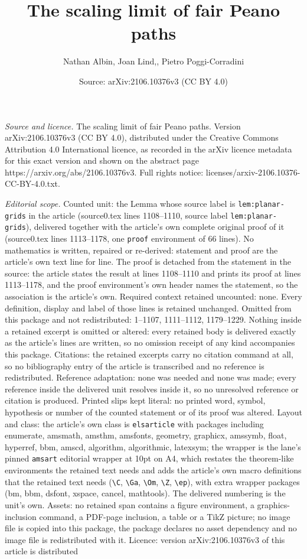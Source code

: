 \documentclass[10pt,a4paper]{amsart}
\title[The scaling limit of fair Peano paths]{The scaling limit of fair Peano paths}
\author{Nathan Albin, Joan Lind,, Pietro Poggi-Corradini}
\date{Source: arXiv:2106.10376v3 (CC BY 4.0)}
\begin{document}
\maketitle

\noindent\emph{Source and licence.} The scaling limit of fair Peano paths. Version arXiv:2106.10376v3 (CC BY 4.0), distributed under the Creative Commons Attribution 4.0 International licence, as recorded in the arXiv licence metadata for this exact version and shown on the abstract page https://arxiv.org/abs/2106.10376v3. Full rights notice: licenses/arxiv-2106.10376-CC-BY-4.0.txt.\par\smallskip

\noindent\textit{Editorial scope.} Counted unit: the Lemma whose source label is \texttt{lem:planar-grids} in the article (source0.tex lines 1108--1110, source label \texttt{lem:planar-grids}), delivered together with the article's own complete original proof of it (source0.tex lines 1113--1178, one \texttt{proof} environment of 66 lines). No mathematics is written, repaired or re-derived: statement and proof are the article's own text line for line. The proof is detached from the statement in the source: the article states the result at lines 1108--1110 and prints its proof at lines 1113--1178, and the proof environment's own header names the statement, so the association is the article's own. Required context retained uncounted: none. Every definition, display and label of those lines is retained unchanged. Omitted from this package and not redistributed: 1--1107, 1111--1112, 1179--1229. Nothing inside a retained excerpt is omitted or altered: every retained body is delivered exactly as the article's lines are written, so no omission receipt of any kind accompanies this package. Citations: the retained excerpts carry no citation command at all, so no bibliography entry of the article is transcribed and no reference is redistributed. Reference adaptation: none was needed and none was made; every reference inside the delivered unit resolves inside it, so no unresolved reference or citation is produced. Printed slips kept literal: no printed word, symbol, hypothesis or number of the counted statement or of its proof was altered. Layout and class: the article's own class is \texttt{elsarticle} with packages including enumerate, amsmath, amsthm, amsfonts, geometry, graphicx, amssymb, float, hyperref, bbm, amscd, algorithm, algorithmic, latexsym; the wrapper is the lane's pinned \texttt{amsart} editorial wrapper at 10pt on A4, which restates the theorem-like environments the retained text needs and adds the article's own macro definitions that the retained text needs (\texttt{\textbackslash C}, \texttt{\textbackslash Ga}, \texttt{\textbackslash Om}, \texttt{\textbackslash Z}, \texttt{\textbackslash ep}), with extra wrapper packages (bm, bbm, dsfont, xspace, cancel, mathtools). The delivered numbering is the unit's own. Assets: no retained span contains a figure environment, a graphics-inclusion command, a PDF-page inclusion, a table or a TikZ picture; no image file is copied into this package, the package declares no asset dependency and no image file is redistributed with it. Licence: version arXiv:2106.10376v3 of this article is distributed 
\end{document}
